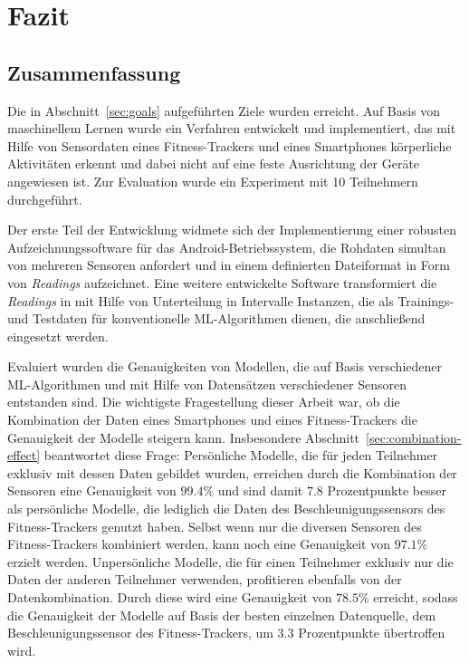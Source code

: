 \chapter{Fazit}
\label{chap:conclusions}

\section{Zusammenfassung}
Die in Abschnitt~\ref{sec:goals} aufgeführten Ziele wurden erreicht. Auf Basis von maschinellem Lernen wurde ein Verfahren entwickelt und implementiert, das mit Hilfe von Sensordaten eines Fitness-Trackers und eines Smartphones körperliche Aktivitäten erkennt und dabei nicht auf eine feste Ausrichtung der Geräte angewiesen ist. Zur Evaluation wurde ein Experiment mit 10 Teilnehmern durchgeführt.

Der erste Teil der Entwicklung widmete sich der Implementierung einer robusten Aufzeichnungssoftware für das Android-Betriebssystem, die Rohdaten simultan von mehreren Sensoren anfordert und in einem definierten Dateiformat in Form von \textit{Readings} aufzeichnet. Eine weitere entwickelte Software transformiert die \textit{Readings} in mit Hilfe von Unterteilung in Intervalle Instanzen, die als Trainings- und Testdaten für konventionelle ML-Algorithmen dienen, die anschließend eingesetzt werden.

Evaluiert wurden die Genauigkeiten von Modellen, die auf Basis verschiedener ML-Algorithmen und mit Hilfe von Datensätzen verschiedener Sensoren entstanden sind. Die wichtigste Fragestellung dieser Arbeit war, ob die Kombination der Daten eines Smartphones und eines Fitness-Trackers die Genauigkeit der Modelle steigern kann. Insbesondere Abschnitt~\ref{sec:combination-effect} beantwortet diese Frage: Persönliche Modelle, die für jeden Teilnehmer exklusiv mit dessen Daten gebildet wurden, erreichen durch die Kombination der Sensoren eine Genauigkeit von $99.4 \%$ und sind damit $7.8$ Prozentpunkte besser als persönliche Modelle, die lediglich die Daten des Beschleunigungssensors des Fitness-Trackers genutzt haben. Selbst wenn nur die diversen Sensoren des Fitness-Trackers kombiniert werden, kann noch eine Genauigkeit von $97.1 \%$ erzielt werden. Unpersönliche Modelle, die für einen Teilnehmer exklusiv nur die Daten der anderen Teilnehmer verwenden, profitieren ebenfalls von der Datenkombination. Durch diese wird eine Genauigkeit von $78.5 \%$ erreicht, sodass die Genauigkeit der Modelle auf Basis der besten einzelnen Datenquelle, dem Beschleunigungssensor des Fitness-Trackers, um $3.3$ Prozentpunkte übertroffen wird.

